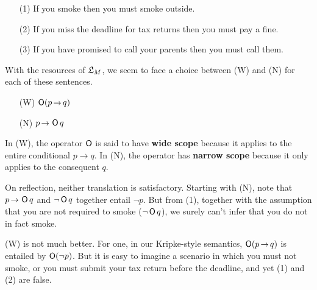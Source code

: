 \begin{itemize}[leftmargin=10mm]
\itemsep-1mm
\item[(1)] If you smoke then you must smoke outside.
\item[(2)] If you miss the deadline for tax returns then you must pay a fine.
\item[(3)] If you have promised to call your parents then you must call them.
\end{itemize}
%
With the resources of $\mathfrak{L}_M$, we seem to face a choice between (W) and (N) for each of these sentences.
\begin{itemize}[leftmargin=10mm]
\itemsep-1mm
\item[(W)] $\Ob(p \to q)$
\item[(N)] $p \to \Ob q$
\end{itemize}
In (W), the operator $\operatorname{\mathsf{O}}$ is said to have \textbf{wide scope} because it
applies to the entire conditional $p \to q$. In (N), the operator has
\textbf{narrow scope} because it only applies to the consequent $q$.

On reflection, neither translation is satisfactory. Starting with (N), note that
$p \to \Ob q$ and $\neg \operatorname{\mathsf{O}} q$ together entail $\neg p$. But from (1), together
with the assumption that you are not required to smoke ($\neg \operatorname{\mathsf{O}} q$), we surely
can't infer that you do not in fact smoke.

%

(W) is not much better. For one, in our Kripke-style semantics, $\Ob(p \to q)$
is entailed by $\operatorname{\mathsf{O}}(\neg p)$. But it is easy to imagine a scenario in which you
must not smoke, or you must submit your tax return before the deadline, and yet
(1) and (2) are false.


